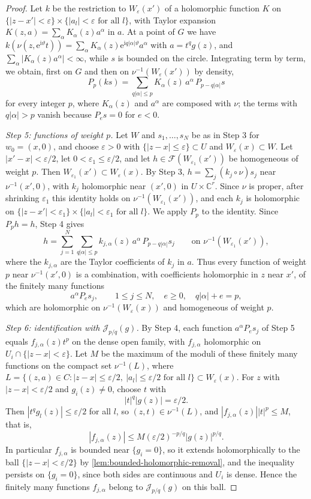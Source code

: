 \begin{proof}
Let $k$ be the restriction to $W_\varepsilon(x')$ of a holomorphic function $K$ on $\{|z-x'|<\varepsilon\}\times\{|a_l|<\varepsilon\text{ for all }l\}$, with Taylor expansion $K(z,a)=\sum_\alpha K_\alpha(z)a^\alpha$ in $a$. At a point of $G$ we have $k(\nu(z,\mathrm e^{\mathrm i\vartheta}t))=\sum_\alpha K_\alpha(z)\mathrm e^{\mathrm iq|\alpha|\vartheta}a^\alpha$ with $a=t^qg(z)$, and $\sum_\alpha|K_\alpha(z)a^\alpha|<\infty$, while $s$ is bounded on the circle. Integrating term by term, we obtain, first on $G$ and then on $\nu^{-1}(W_\varepsilon(x'))$ by density,
\[
 P_p(ks)=\sum_{q|\alpha|\leq p}K_\alpha(z)\,a^\alpha\,P_{p-q|\alpha|}s
\]
for every integer $p$, where $K_\alpha(z)$ and $a^\alpha$ are composed with $\nu$; the terms with $q|\alpha|>p$ vanish because $P_es=0$ for $e<0$.

\emph{Step 5: functions of weight $p$.} Let $W$ and $s_1,\ldots,s_N$ be as in Step 3 for $w_0=(x,0)$, and choose $\varepsilon>0$ with $\{|z-x|\leq\varepsilon\}\subset U$ and $W_\varepsilon(x)\subset W$. Let $|x'-x|<\varepsilon/2$, let $0<\varepsilon_1\leq\varepsilon/2$, and let $h\in\mathcal F(W_{\varepsilon_1}(x'))$ be homogeneous of weight $p$. Then $W_{\varepsilon_1}(x')\subset W_\varepsilon(x)$. By Step 3, $h=\sum_j(k_j\circ\nu)s_j$ near $\nu^{-1}(x',0)$, with $k_j$ holomorphic near $(x',0)$ in $U\times\mathbb C^r$. Since $\nu$ is proper, after shrinking $\varepsilon_1$ this identity holds on $\nu^{-1}(W_{\varepsilon_1}(x'))$, and each $k_j$ is holomorphic on $\{|z-x'|<\varepsilon_1\}\times\{|a_l|<\varepsilon_1\text{ for all }l\}$. We apply $P_p$ to the identity. Since $P_ph=h$, Step 4 gives
\[
 h=\sum_{j=1}^N\sum_{q|\alpha|\leq p}k_{j,\alpha}(z)\,a^\alpha\,P_{p-q|\alpha|}s_j
 \qquad\text{on }\nu^{-1}(W_{\varepsilon_1}(x')),
\]
where the $k_{j,\alpha}$ are the Taylor coefficients of $k_j$ in $a$. Thus every function of weight $p$ near $\nu^{-1}(x',0)$ is a combination, with coefficients holomorphic in $z$ near $x'$, of the finitely many functions
\[
 a^\alpha P_es_j,\qquad 1\leq j\leq N,\quad e\geq0,\quad q|\alpha|+e=p,
\]
which are holomorphic on $\nu^{-1}(W_\varepsilon(x))$ and homogeneous of weight $p$.

\emph{Step 6: identification with $\mathcal J_{p/q}(g)$.} By Step 4, each function $a^\alpha P_es_j$ of Step 5 equals $f_{j,\alpha}(z)t^p$ on the dense open family, with $f_{j,\alpha}$ holomorphic on $U_i\cap\{|z-x|<\varepsilon\}$. Let $M$ be the maximum of the moduli of these finitely many functions on the compact set $\nu^{-1}(L)$, where $L=\{(z,a)\in C:|z-x|\leq\varepsilon/2,\ |a_l|\leq\varepsilon/2\text{ for all }l\}\subset W_\varepsilon(x)$. For $z$ with $|z-x|<\varepsilon/2$ and $g_i(z)\neq0$, choose $t$ with
\[
 |t|^q|g(z)|=\varepsilon/2.
\]
Then $|t^qg_l(z)|\leq\varepsilon/2$ for all $l$, so $(z,t)\in\nu^{-1}(L)$, and $|f_{j,\alpha}(z)||t|^p\leq M$, that is,
\[
 |f_{j,\alpha}(z)|\leq M(\varepsilon/2)^{-p/q}|g(z)|^{p/q}.
\]
In particular $f_{j,\alpha}$ is bounded near $\{g_i=0\}$, so it extends holomorphically to the ball $\{|z-x|<\varepsilon/2\}$ by \cref{lem:bounded-holomorphic-removal}, and the inequality persists on $\{g_i=0\}$, since both sides are continuous and $U_i$ is dense. Hence the finitely many functions $f_{j,\alpha}$ belong to $\mathcal J_{p/q}(g)$ on this ball.


\end{proof}
